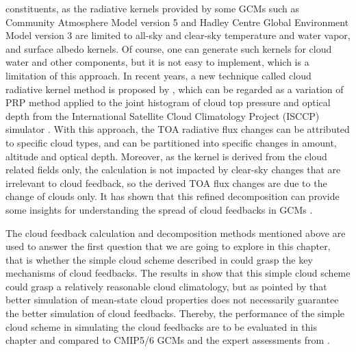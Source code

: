 constituents, as the radiative kernels provided by some GCMs such as Community Atmosphere Model version 5 \citep[ CAM5;][]{Pendergrass2018} and Hadley Centre Global Environment Model version 3 \citep[HadGEM3;][]{Smith2020} are limited to all-sky and clear-sky temperature and water vapor, and surface albedo kernels. Of course, one can generate such kernels for cloud water and other components, but it is not easy to implement, which is a limitation of this approach. In recent years, a new technique called cloud radiative kernel method is proposed by \cite{Zelinka2012computing1,Zelinka2012computing2}, which can be regarded as a variation of PRP method applied to the joint histogram of cloud top pressure and optical depth from the International Satellite Cloud Climatology Project (ISCCP) simulator \citep{Klein1999validation,Webb2001combining}. With this approach, the TOA radiative flux changes can be attributed to specific cloud types, and can be partitioned into specific changes in amount, altitude and optical depth. Moreover, as the kernel is derived from the cloud related fields only, the calculation is not impacted by clear-sky changes that are irrelevant to cloud feedback, so the derived TOA flux changes are due to the change of clouds only. It has shown that this refined decomposition can provide some insights for understanding the spread of cloud feedbacks in GCMs \citep[e.g.,][]{Zelinka2016insights,Zelinka2020causes,Zelinka2021evaluating}.

The cloud feedback calculation and decomposition methods mentioned above are used to answer the first question that we are going to explore in this chapter, that is whether the simple cloud scheme described in  could grasp the key mechanisms of cloud feedbacks. The results in  show that this simple cloud scheme could grasp a relatively reasonable cloud climatology, but as pointed by \cite{Zelinka2021evaluating} that better simulation of mean-state cloud properties does not necessarily guarantee the better simulation of cloud feedbacks. Thereby, the performance of the simple cloud scheme in simulating the cloud feedbacks are to be evaluated in this chapter and compared to CMIP5/6 GCMs and the expert assessments from \cite{Sherwood2020}. 

